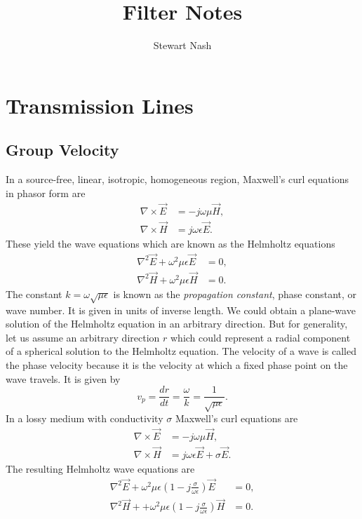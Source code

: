 \documentclass{article}
\begin{document}
	\title{Filter Notes}
	\author{Stewart Nash}

	\maketitle
	\section{Transmission Lines}
		\subsection{Group Velocity}
In a source-free, linear, isotropic, homogeneous region, Maxwell's curl equations in phasor form are
\begin{align}
	\nabla\times\vec{E}&=-j\omega\mu\vec{H},\\
	\nabla\times\vec{H}&=j\omega\epsilon\vec{E}.
\end{align}
These yield the wave equations which are known as the Helmholtz equations
\begin{align}
	\nabla^2\vec{E}+\omega^2\mu\epsilon\vec{E}&=0,\\
	\nabla^2\vec{H}+\omega^2\mu\epsilon\vec{H}&=0.
\end{align}
The constant $k=\omega\sqrt{\mu\epsilon}$ is known as the \emph{propagation constant}, phase constant, or wave number. It is given in units of inverse length.
We could obtain a plane-wave solution of the Helmholtz equation in an arbitrary direction. But for generality, let us assume an arbitrary direction $r$ which could represent a radial component of a spherical solution to the Helmholtz equation. The velocity of a wave is called the phase velocity because it is the velocity at which a fixed phase point on the wave travels. It is given by
\begin{equation}
	v_p=\frac{dr}{dt}=\frac{\omega}{k}=\frac{1}{\sqrt{\mu\epsilon}}.
\end{equation}
In a lossy medium with conductivity $\sigma$ Maxwell's curl equations are
\begin{align}
	\nabla\times\vec{E}&=-j\omega\mu\vec{H},\\
	\nabla\times\vec{H}&=j\omega\epsilon\vec{E}+\sigma\vec{E}.
\end{align}
The resulting Helmholtz wave equations are
\begin{align}
	\nabla^2\vec{E}+\omega^2\mu\epsilon\left(1-j\frac{\sigma}{\omega\epsilon}\right)\vec{E}&=0,\\
	\nabla^2\vec{H}++\omega^2\mu\epsilon\left(1-j\frac{\sigma}{\omega\epsilon}\right)\vec{H}&=0.
\end{align}
\end{document}
